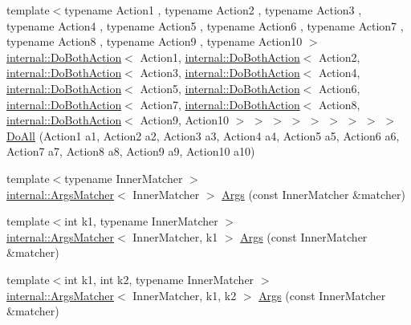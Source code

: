 \begin{DoxyCompactItemize}
\item 
{\footnotesize template$<$typename Action1 , typename Action2 , typename Action3 , typename Action4 , typename Action5 , typename Action6 , typename Action7 , typename Action8 , typename Action9 , typename Action10 $>$ }\\\mbox{\hyperlink{classtesting_1_1internal_1_1_do_both_action}{internal\+::\+Do\+Both\+Action}}$<$ Action1, \mbox{\hyperlink{classtesting_1_1internal_1_1_do_both_action}{internal\+::\+Do\+Both\+Action}}$<$ Action2, \mbox{\hyperlink{classtesting_1_1internal_1_1_do_both_action}{internal\+::\+Do\+Both\+Action}}$<$ Action3, \mbox{\hyperlink{classtesting_1_1internal_1_1_do_both_action}{internal\+::\+Do\+Both\+Action}}$<$ Action4, \mbox{\hyperlink{classtesting_1_1internal_1_1_do_both_action}{internal\+::\+Do\+Both\+Action}}$<$ Action5, \mbox{\hyperlink{classtesting_1_1internal_1_1_do_both_action}{internal\+::\+Do\+Both\+Action}}$<$ Action6, \mbox{\hyperlink{classtesting_1_1internal_1_1_do_both_action}{internal\+::\+Do\+Both\+Action}}$<$ Action7, \mbox{\hyperlink{classtesting_1_1internal_1_1_do_both_action}{internal\+::\+Do\+Both\+Action}}$<$ Action8, \mbox{\hyperlink{classtesting_1_1internal_1_1_do_both_action}{internal\+::\+Do\+Both\+Action}}$<$ Action9, Action10 $>$ $>$ $>$ $>$ $>$ $>$ $>$ $>$ $>$ \mbox{\hyperlink{namespacetesting_a79ac222c485c7aa0a1774bee17dadb10}{Do\+All}} (Action1 a1, Action2 a2, Action3 a3, Action4 a4, Action5 a5, Action6 a6, Action7 a7, Action8 a8, Action9 a9, Action10 a10)
\item 
{\footnotesize template$<$typename Inner\+Matcher $>$ }\\\mbox{\hyperlink{classtesting_1_1internal_1_1_args_matcher}{internal\+::\+Args\+Matcher}}$<$ Inner\+Matcher $>$ \mbox{\hyperlink{namespacetesting_aaca153f67b689b8b9d5b8c67ecf8cee4}{Args}} (const Inner\+Matcher \&matcher)
\item 
{\footnotesize template$<$int k1, typename Inner\+Matcher $>$ }\\\mbox{\hyperlink{classtesting_1_1internal_1_1_args_matcher}{internal\+::\+Args\+Matcher}}$<$ Inner\+Matcher, k1 $>$ \mbox{\hyperlink{namespacetesting_af67bac6da407df7586f60cfa2c9b602d}{Args}} (const Inner\+Matcher \&matcher)
\item 
{\footnotesize template$<$int k1, int k2, typename Inner\+Matcher $>$ }\\\mbox{\hyperlink{classtesting_1_1internal_1_1_args_matcher}{internal\+::\+Args\+Matcher}}$<$ Inner\+Matcher, k1, k2 $>$ \mbox{\hyperlink{namespacetesting_a663409e441584c81f496e9c98fd3453c}{Args}} (const Inner\+Matcher \&matcher)

\end{DoxyCompactItemize}
